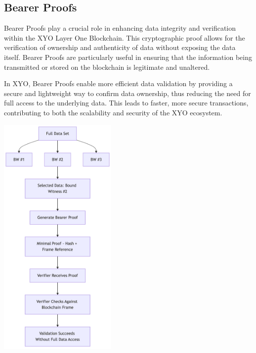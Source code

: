 \documentclass{article}
\begin{document}
\subsection{Bearer Proofs}
\begin{minipage}[t]{0.45\textwidth}
\raggedright
Bearer Proofs play a crucial role in enhancing data integrity and verification within the XYO Layer One Blockchain. This cryptographic proof allows for the verification of ownership and authenticity of data without exposing the data itself. Bearer Proofs are particularly useful in ensuring that the information being transmitted or stored on the blockchain is legitimate and unaltered.

In XYO, Bearer Proofs enable more efficient data validation by providing a secure and lightweight way to confirm data ownership, thus reducing the need for full access to the underlying data. This leads to faster, more secure transactions, contributing to both the scalability and security of the XYO ecosystem.

\end{minipage}%
\hfill
\begin{minipage}[t]{0.42\textwidth}
\centering
\vspace*{-2.5em} %
\includegraphics[height=12cm]{bearer-proof.png}
\vspace{0.5em} %
\end{minipage}
\end{document}

